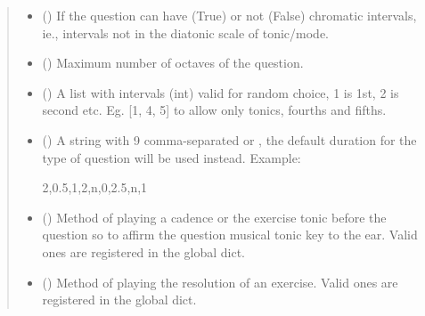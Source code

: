 \documentclass[letterpaper,10pt,english]{sphinxmanual}
\begin{document}
\begin{fulllineitems}
\begin{fulllineitems}
\begin{quote}
\begin{description}
\begin{itemize}
\item {} 
 () \textendash{} If the question can have (True) or not (False)
chromatic intervals, ie., intervals not in the diatonic scale
of tonic/mode.

\item {} 
 () \textendash{} Maximum number of octaves of the question.

\item {} 
 () \textendash{} A list with intervals (int) valid for
random choice, 1 is 1st, 2 is second etc. Eg. {[}1, 4, 5{]} to
allow only tonics, fourths and fifths.

\item {} 
 () \textendash{} 
A string with 9 comma-separated  or
, the
default duration for the type of question will be used instead.
Example:

\begin{sphinxVerbatim}[commandchars=\\\{\}]
\PYGZdq{}2,0.5,1,2,n,0,2.5,n,1\PYGZdq{}
\end{sphinxVerbatim}


\item {} 
 () \textendash{} Method of playing a cadence or the
exercise tonic before the question so to affirm the question
musical tonic key to the ear. Valid ones are registered in the
 global dict.

\item {} 
 () \textendash{} Method of playing the resolution of an
exercise. Valid ones are registered in the
 global dict.


\end{itemize}
\end{description}
\end{quote}
\end{fulllineitems}
\end{fulllineitems}
\end{document}
